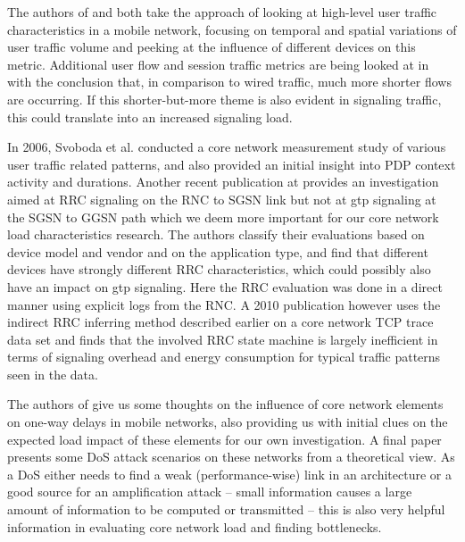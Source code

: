 The authors of \cite{shafiq2011characterizing} and \cite{paul2011understanding} both take the approach of looking at high-level user traffic characteristics in a mobile network, focusing on temporal and spatial variations of user traffic volume and peeking at the influence of different devices on this metric. Additional user flow and session traffic metrics are being looked at in \cite{Zhang:2012:UCC:2377677.2377764} with the conclusion that, in comparison to wired traffic, much more shorter flows are occurring. If this shorter-but-more theme is also evident in signaling traffic, this could translate into an increased signaling load.

In 2006, Svoboda et al. \cite{svoboda2006composition} conducted a core network measurement study of various user traffic related patterns, and also provided an initial insight into \gls{PDP} context activity and durations. Another recent publication at \cite{he2012panoramic} provides an investigation aimed at \gls{RRC} signaling on the \gls{RNC} to \gls{SGSN} link but not at \gls{gtp} signaling at the \gls{SGSN} to \gls{GGSN} path which we deem more important for our core network load characteristics research. The authors classify their evaluations based on device model and vendor and on the application type, and find that different devices have strongly different \gls{RRC} characteristics, which could possibly also have an impact on \gls{gtp} signaling. Here the \gls{RRC} evaluation was done in a direct manner using explicit logs from the \gls{RNC}. A 2010 publication\cite{Qian:2010:CRR:1879141.1879159} however uses the indirect \gls{RRC} inferring method described earlier on a core network TCP trace data set and finds that the involved \gls{RRC} state machine is largely inefficient in terms of signaling overhead and energy consumption for typical traffic patterns seen in the data.

The authors of \cite{4675847} give us some thoughts on the influence of core network elements on one-way delays in mobile networks, also providing us with initial clues on the expected load impact of these elements for our own investigation. A final paper \cite{Ricciato2010551} presents some \gls{DoS} attack scenarios on these networks from a theoretical view. As a \gls{DoS} either needs to find a weak (performance-wise) link in an architecture or a good source for an amplification attack -- small information causes a large amount of information to be computed or transmitted -- this is also very helpful information in evaluating core network load and finding bottlenecks.

